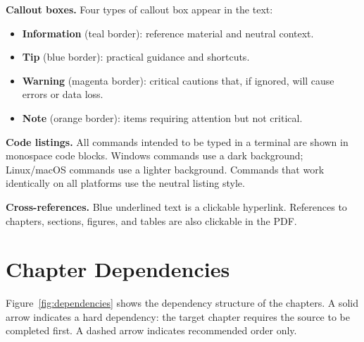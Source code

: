 \noindent
\textbf{Callout boxes.} Four types of callout box appear in the text:

\begin{itemize}
    \item \textbf{Information} (teal border): reference material and
          neutral context.
    \item \textbf{Tip} (blue border): practical guidance and
          shortcuts.
    \item \textbf{Warning} (magenta border): critical cautions
          that, if ignored, will cause errors or data loss.
    \item \textbf{Note} (orange border): items requiring attention
          but not critical.
\end{itemize}

\noindent
\textbf{Code listings.} All commands intended to be typed in a
terminal are shown in monospace code blocks. Windows commands use a
dark background; Linux/macOS commands use a lighter background.
Commands that work identically on all platforms use the neutral
listing style.

\noindent
\textbf{Cross-references.} Blue underlined text is a clickable
hyperlink. References to chapters, sections, figures, and tables are
also clickable in the PDF.

\section*{Chapter Dependencies}

      \renewcommand{\thefigure}{\arabic{figure}}
      \setcounter{figure}{0}
      Figure~\ref{fig:dependencies} shows the dependency structure of the
      chapters. A solid arrow indicates a hard dependency: the target chapter
      requires the source to be completed first. A dashed arrow indicates
      recommended order only.

